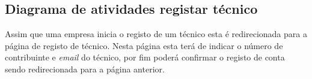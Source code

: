 







\newpage

\subsection{Diagrama de atividades registar técnico}

Assim que uma empresa inicia o registo de um técnico esta é redirecionada para a página de registo de técnico.
Nesta página esta terá de indicar o número de contribuinte e \textit{email} do técnico, por fim poderá confirmar o registo
de conta sendo redirecionada para a página anterior.

